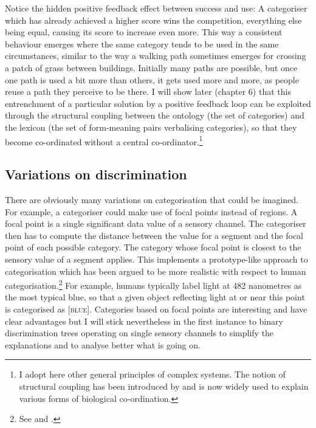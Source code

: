 Notice the hidden positive feedback effect between success
and use: A categoriser which has already achieved
a higher score wins the competition, everything else being
equal, causing its score to increase even more. 
This way a consistent behaviour emerges where the 
same category tends to be used in the same circumstances, 
similar to the way a walking path sometimes 
emerges for crossing a patch of grass between buildings. 
Initially many paths are possible, but once one path 
is used a bit more than others, it gets used more and 
more, as people reuse a path they perceive to be
there. I will show later (chapter 6) that this entrenchment of 
a particular solution by a positive feedback loop can 
be exploited through the structural coupling between 
the ontology (the set of categories) and the lexicon
(the set of form-meaning pairs verbalising categories), 
so that they become co-ordinated without a central 
co-ordinator.\footnote{
I adopt here other general principles of complex
systems. The notion of structural coupling has been 
introduced by \cite{Maturana:1992} and is 
now widely used to explain various forms of 
biological co-ordination.}

\subsection{Variations on discrimination}

There are obviously many variations on categorisation
that could be imagined. For example, a categoriser
could make use of focal points instead of regions. A focal 
point is a single significant data value of a sensory channel.
The categoriser then has to compute the distance 
between the value for a segment and the focal point 
of each possible category. The category 
whose focal point is closest to the sensory value
of a segment applies. This implements a prototype-like
approach to categorisation which has been argued to 
be more realistic with respect to human categorisation.\footnote{
See \cite{Varela:1991} and \cite{Taylor:1989}.}
For example, humans typically label light
at 482 nanometres as the most typical blue, so that a given object
reflecting light at or near this point is categorised
as [\textsc{blue}]. Categories based on focal points are 
interesting and have clear advantages 
but I will stick nevertheless in the first instance 
to binary discrimination trees operating on single sensory 
channels to simplify the explanations
and to analyse better what is going on. 

